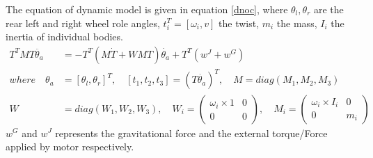 The equation of  dynamic model  is given in equation \ref{dnoc}, where $\theta_l, \theta_r $ are the rear left and right wheel role angles, $t_i^T=[\omega_i, v]$ the twist, $m_i$ the mass, $I_i$ the inertia of individual bodies.
\begin{equation}
\label{dnoc}
\begin{aligned}
T^TMT\ddot{\theta_a}&=-T^T(M\dot{T}+WMT)\dot{\theta_a}+T^T(w^J+w^G)\\
where\quad \theta_a&=[\theta_l, \theta_r]^T , \quad [t_1,t_2,t_3]=(T\dot{\theta_a})^T, \quad M=diag(M_1, M_2, M_3)\\
W&=diag(W_1,W_2,W_3),\quad W_i=\begin{pmatrix}
\omega_i\times 1 & 0\\ 0 & 0
\end{pmatrix},\quad M_i=\begin{pmatrix}
\omega_i\times I_i & 0\\ 0 & m_i
\end{pmatrix}
\end{aligned}
\end{equation}
$w^G$ and $ w^J$ represents the gravitational force and the external torque/Force applied by motor respectively. 

